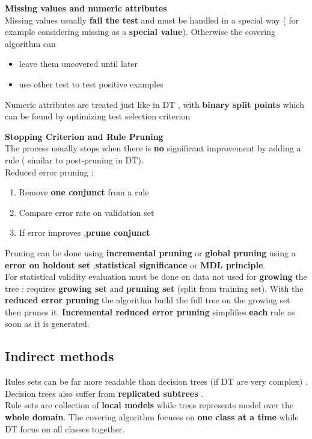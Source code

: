 \begin{description}
\item \textbf{Missing values and numeric attributes}\\
Missing values usually \textbf{fail the test} and must be handled in a special way ( for example considering missing as a \textbf{special value}). Otherwise the covering algorithm can \begin{itemize}
\item leave them uncovered until later
\item use other test to test positive examples
\end{itemize}
Numeric attributes are treated just like in DT , with \textbf{binary split points} which can be found by optimizing test selection criterion

\item \textbf{Stopping Criterion and Rule Pruning}\\
The process usually stops when there is \textbf{no} significant improvement by adding a rule ( similar to post-pruning in DT).\\
Reduced error pruning :
\begin{enumerate}
\item Remove \textbf{one conjunct} from a rule
\item Compare error rate on validation set
\item If error improves ,\textbf{prune conjunct}
\end{enumerate}
Pruning can be done using \textbf{incremental pruning} or \textbf{global pruning} using a \textbf{error on holdout set} ,\textbf{statistical significance} or \textbf{MDL principle}.\\
For statistical validity evaluation must be done on data not used for \textbf{growing} the tree : requires \textbf{growing set} and \textbf{pruning set} (split from training set). With the \textbf{reduced error pruning} the algorithm build the full tree on the growing set then prunes it. \textbf{Incremental reduced error pruning} simplifies \textbf{each} rule as soon as it is generated. 
\end{description}

\subsection{Indirect methods}
Rules sets can be far more readable than decision trees (if DT are very complex) . Decision trees also suffer from \textbf{replicated subtrees} .\\Rule sets are collection of \textbf{local models} while trees represents model over the \textbf{whole domain}. The covering algorithm focuses on \textbf{one class at a time} while DT focus on all classes together.